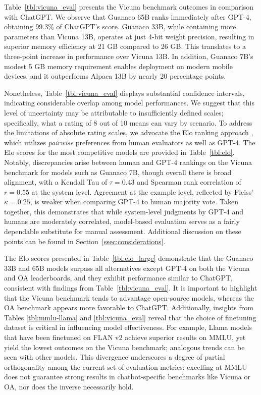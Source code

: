 Table~\ref{tbl:vicuna_eval} presents the Vicuna benchmark \cite{vicuna2023} outcomes in comparison with ChatGPT. We observe that {Guanaco} 65B ranks immediately after GPT-4, obtaining 99.3\% of ChatGPT’s score. {Guanaco} 33B, while containing more parameters than Vicuna 13B, operates at just 4-bit weight precision, resulting in superior memory efficiency at 21 GB compared to 26 GB. This translates to a three-point increase in performance over Vicuna 13B. In addition, {Guanaco} 7B’s modest 5 GB memory requirement enables deployment on modern mobile devices, and it outperforms Alpaca 13B by nearly 20 percentage points.

Nonetheless, Table~\ref{tbl:vicuna_eval} displays substantial confidence intervals, indicating considerable overlap among model performances. We suggest that this level of uncertainty may be attributable to insufficiently defined scales; specifically, what a rating of 8 out of 10 means can vary by scenario. To address the limitations of absolute rating scales, we advocate the Elo ranking approach \citep{elo1967proposed}, which utilizes \textit{pairwise} preferences from human evaluators as well as GPT-4. The Elo scores for the most competitive models are provided in Table~\ref{tbl:elo}. Notably, discrepancies arise between human and GPT-4 rankings on the Vicuna benchmark for models such as Guanaco 7B, though overall there is broad alignment, with a Kendall Tau of $\tau=0.43$ and Spearman rank correlation of $r=0.55$ at the system level. Agreement at the example level, reflected by Fleiss’ $\kappa=0.25$, is weaker when comparing GPT-4 to human majority vote. Taken together, this demonstrates that while system-level judgments by GPT-4 and humans are moderately correlated, model-based evaluation serves as a fairly dependable substitute for manual assessment. Additional discussion on these points can be found in Section~\ref{ssec:considerations}.

The Elo scores presented in Table~\ref{tbl:elo_large} demonstrate that the {Guanaco} 33B and 65B models surpass all alternatives except GPT-4 on both the Vicuna and OA leaderboards, and they exhibit performance similar to ChatGPT, consistent with findings from Table~\ref{tbl:vicuna_eval}. It is important to highlight that the Vicuna benchmark tends to advantage open-source models, whereas the OA benchmark appears more favorable to ChatGPT. Additionally, insights from Tables \ref{tbl:mmlu-llama} and \ref{tbl:vicuna_eval} reveal that the choice of finetuning dataset is critical in influencing model effectiveness. For example, Llama models that have been finetuned on FLAN v2 achieve superior results on MMLU, yet yield the lowest outcomes on the Vicuna benchmark; analogous trends can be seen with other models. This divergence underscores a degree of partial orthogonality among the current set of evaluation metrics: excelling at MMLU does not guarantee strong results in chatbot-specific benchmarks like Vicuna or OA, nor does the inverse necessarily hold.

